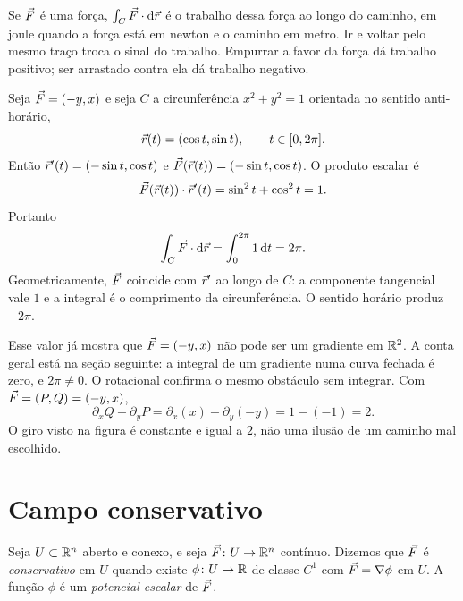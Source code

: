 \documentclass[11pt,a4paper]{article}
\begin{document}
\begin{intuicao}
Se $\vec{F}$ é uma força, $\int_C\vec{F}\cdot\mathrm{d}\vec{r}$ é o trabalho dessa força ao longo do caminho, em joule quando a força está em newton e o caminho em metro. Ir e voltar pelo mesmo traço troca o sinal do trabalho. Empurrar a favor da força dá trabalho positivo; ser arrastado contra ela dá trabalho negativo.
\end{intuicao}

\begin{exemplo}
Seja $\vec{F}=(-y,x)$ e seja $C$ a circunferência $x^2+y^2=1$ orientada no sentido anti-horário,
\[
\vec{r}(t)=(\cos t,\sin t),\qquad t\in[0,2\pi].
\]
Então $\vec{r}'(t)=(-\sin t,\cos t)$ e $\vec{F}(\vec{r}(t))=(-\sin t,\cos t)$. O produto escalar é
\[
\vec{F}(\vec{r}(t))\cdot\vec{r}'(t)
=\sin^2 t+\cos^2 t=1.
\]
Portanto
\[
\int_C \vec{F}\cdot\mathrm{d}\vec{r}
=\int_0^{2\pi} 1\,\mathrm{d} t=2\pi.
\]
Geometricamente, $\vec{F}$ coincide com $\vec{r}'$ ao longo de $C$: a componente tangencial vale $1$ e a integral é o comprimento da circunferência. O sentido horário produz $-2\pi$.
\end{exemplo}

Esse valor já mostra que $\vec{F}=(-y,x)$ não pode ser um gradiente em $\mathbb{R}^2$. A conta geral está na seção seguinte: a integral de um gradiente numa curva fechada é zero, e $2\pi\neq 0$. O rotacional confirma o mesmo obstáculo sem integrar. Com $\vec{F}=(P,Q)=(-y,x)$,
\[
\partial_x Q-\partial_y P=\partial_x(x)-\partial_y(-y)=1-(-1)=2.
\]
O giro visto na figura é constante e igual a $2$, não uma ilusão de um caminho mal escolhido.

\section{Campo conservativo}


\begin{definicao}
Seja $U\subset\mathbb{R}^n$ aberto e conexo, e seja $\vec{F}\colon U\to\mathbb{R}^n$ contínuo. Dizemos que $\vec{F}$ é \emph{conservativo} em $U$ quando existe $\phi\colon U\to\mathbb{R}$ de classe $C^1$ com $\vec{F}=\nabla\phi$ em $U$. A função $\phi$ é um \emph{potencial escalar} de $\vec{F}$.
\end{definicao}
\end{document}
